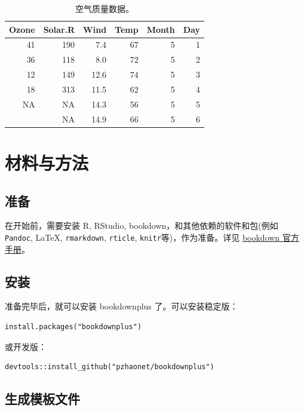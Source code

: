 \documentclass[doublesided]{Style/ucasthesis}%
\begin{document}
\begin{table}

\caption{\label{tab:tabair}空气质量数据。}
\centering
\begin{tabular}[t]{rrrrrr}
\toprule
Ozone & Solar.R & Wind & Temp & Month & Day\\
\midrule
41 & 190 & 7.4 & 67 & 5 & 1\\
36 & 118 & 8.0 & 72 & 5 & 2\\
12 & 149 & 12.6 & 74 & 5 & 3\\
18 & 313 & 11.5 & 62 & 5 & 4\\
NA & NA & 14.3 & 56 & 5 & 5\\
\addlinespace
28 & NA & 14.9 & 66 & 5 & 6\\
\bottomrule
\end{tabular}
\end{table}

\hypertarget{ux6750ux6599ux4e0eux65b9ux6cd5}{%
\chapter{材料与方法}\label{ux6750ux6599ux4e0eux65b9ux6cd5}}

\hypertarget{ux51c6ux5907}{%
\section{准备}\label{ux51c6ux5907}}

在开始前，需要安装 R, RStudio, bookdown，和其他依赖的软件和包(例如 \texttt{Pandoc}, LaTeX, \texttt{rmarkdown}, \texttt{rticle}, \texttt{knitr}等)，作为准备。详见 \href{https://bookdown.org/yihui/bookdown/}{bookdown 官方手册}。

\hypertarget{ux5b89ux88c5}{%
\section{安装}\label{ux5b89ux88c5}}

准备完毕后，就可以安装 bookdownplus 了。可以安装稳定版：

\begin{verbatim}
install.packages("bookdownplus")
\end{verbatim}

或开发版：

\begin{verbatim}
devtools::install_github("pzhaonet/bookdownplus")
\end{verbatim}

\hypertarget{ux751fux6210ux6a21ux677fux6587ux4ef6}{%
\section{生成模板文件}\label{ux751fux6210ux6a21ux677fux6587ux4ef6}}
\end{document}
